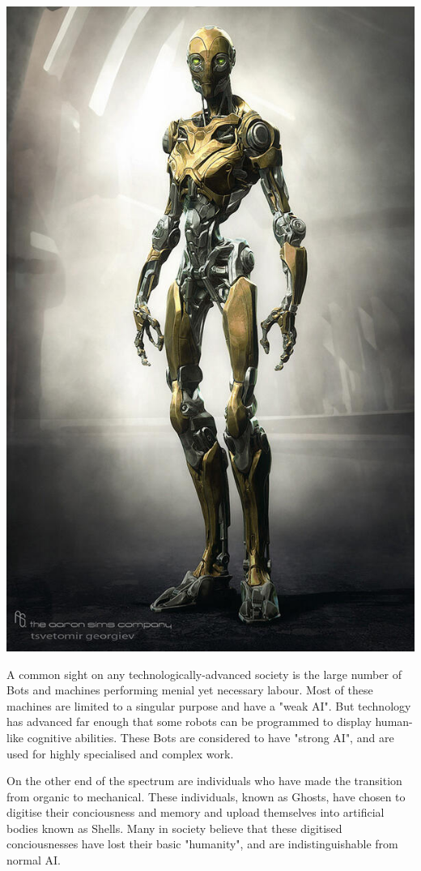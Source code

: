 \documentclass[10pt,twoside]{article}
\begin{document}
\begin{multicols}{2}
  \includegraphics[width=\linewidth]{BEzZuPdCEAAgcr8}

  A common sight on any technologically-advanced society is the large number of Bots and machines performing menial yet necessary labour. Most of these machines are limited to a singular purpose and have a "weak AI". But technology has advanced far enough that some robots can be programmed to display human-like cognitive abilities. These Bots are considered to have "strong AI", and are used for highly specialised and complex work.
  
  On the other end of the spectrum are individuals who have made the transition from organic to mechanical. These individuals, known as Ghosts, have chosen to digitise their conciousness and memory and upload themselves into artificial bodies known as Shells. Many in society believe that these digitised conciousnesses have lost their basic "humanity", and are indistinguishable from normal AI. 
        

\end{multicols}
\end{document}
